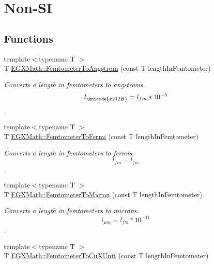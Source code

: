 \hypertarget{group___e_g_x_math-_conversions-_length_conversions-_s_i-_femtometer-_non-_s_i}{}\section{Non-\/\+SI}
\label{group___e_g_x_math-_conversions-_length_conversions-_s_i-_femtometer-_non-_s_i}
\subsection*{Functions}
\begin{DoxyCompactItemize}
\item 
{\footnotesize template$<$typename T $>$ }\\T \mbox{\hyperlink{group___e_g_x_math-_conversions-_length_conversions-_s_i-_femtometer-_non-_s_i_ga72862654ebe3812db0fbf8d11d7059ff}{E\+G\+X\+Math\+::\+Femtometer\+To\+Angstrom}} (const T length\+In\+Femtometer)
\begin{DoxyCompactList}\small\item\em Converts a length in femtometers to angstroms. \[ l_{\unicode{x212B}}=l_{fm} * 10^{-5} \]. \end{DoxyCompactList}\item 
{\footnotesize template$<$typename T $>$ }\\T \mbox{\hyperlink{group___e_g_x_math-_conversions-_length_conversions-_s_i-_femtometer-_non-_s_i_gaa2e838ef76ce47a3375291d76990b865}{E\+G\+X\+Math\+::\+Femtometer\+To\+Fermi}} (const T length\+In\+Femtometer)
\begin{DoxyCompactList}\small\item\em Converts a length in femtometers to fermis. \[ l_{fm}=l_{fm} \]. \end{DoxyCompactList}\item 
{\footnotesize template$<$typename T $>$ }\\T \mbox{\hyperlink{group___e_g_x_math-_conversions-_length_conversions-_s_i-_femtometer-_non-_s_i_gac1a358bdb9bf33dec3cb847cafe1bc71}{E\+G\+X\+Math\+::\+Femtometer\+To\+Micron}} (const T length\+In\+Femtometer)
\begin{DoxyCompactList}\small\item\em Converts a length in femtometers to microns. \[ l_{\mu m}=l_{fm} * 10^{-11} \]. \end{DoxyCompactList}\item 
{\footnotesize template$<$typename T $>$ }\\T \mbox{\hyperlink{group___e_g_x_math-_conversions-_length_conversions-_s_i-_femtometer-_non-_s_i_ga59bde341fe80506851e39cd2ceb3747b}{E\+G\+X\+Math\+::\+Femtometer\+To\+Cu\+X\+Unit}} (const T length\+In\+Femtometer)

\end{DoxyCompactItemize}
